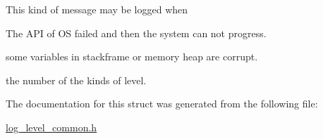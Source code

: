\begin{Desc}
\begin{description}
This kind of message may be logged when
\begin{DoxyItemize}
\item The A\-P\-I of O\-S failed and then the system can not progress.
\item some variables in stackframe or memory heap are corrupt. 
\end{DoxyItemize}\item[{\em 
\hypertarget{structhryky_1_1log_1_1level_1_1_kind_aa121006343f8971f566b5490b8001b21a2611b687250467d875d995119e336755}{num\-\_\-}\label{structhryky_1_1log_1_1level_1_1_kind_aa121006343f8971f566b5490b8001b21a2611b687250467d875d995119e336755}
}]the number of the kinds of level. \end{description}
\end{Desc}



The documentation for this struct was generated from the following file\-:\begin{DoxyCompactItemize}
\item 
\hyperlink{log__level__common_8h}{log\-\_\-level\-\_\-common.\-h}\end{DoxyCompactItemize}
